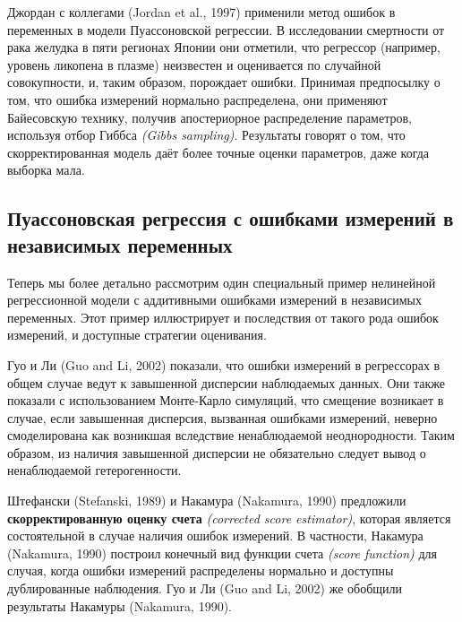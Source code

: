 Джордан с коллегами (Jordan et al., 1997) применили метод ошибок в переменных в модели Пуассоновской регрессии. В исследовании смертности от рака желудка в пяти регионах Японии они отметили, что регрессор (например, уровень ликопена в плазме) неизвестен и оценивается по случайной совокупности, и, таким образом, порождает ошибки. Принимая предпосылку о том, что ошибка измерений нормально распределена, они применяют Байесовскую технику, получив апостериорное распределение параметров, используя отбор Гиббса \emph{(Gibbs sampling)}. Результаты говорят о том, что скорректированная модель даёт более точные оценки параметров, даже когда выборка мала.

\subsection{Пуассоновская регрессия с ошибками измерений в независимых переменных} 
Теперь мы более детально рассмотрим один специальный пример нелинейной регрессионной модели с аддитивными ошибками измерений в независимых переменных. Этот пример иллюстрирует и последствия от такого рода ошибок измерений, и доступные стратегии оценивания.

Гуо и Ли (Guo and Li, 2002) показали, что ошибки измерений в регрессорах в общем случае ведут к завышенной дисперсии наблюдаемых данных. Они также показали с использованием Монте-Карло симуляций, что смещение возникает в случае, если завышенная дисперсия, вызванная ошибками измерений, неверно смоделирована как возникшая вследствие ненаблюдаемой неоднородности. Таким образом, из наличия завышенной дисперсии не обязательно следует вывод о ненаблюдаемой гетерогенности.

Штефански (Stefanski, 1989) и Накамура (Nakamura, 1990) предложили {\bf скорректированную оценку счета} \emph{(corrected score estimator)}, которая является состоятельной в случае наличия ошибок измерений. В частности, Накамура (Nakamura, 1990) построил конечный вид функции счета \emph{(score function)} для случая, когда ошибки измерений распределены нормально и доступны дублированные наблюдения. Гуо и Ли (Guo and Li, 2002) же обобщили результаты Накамуры (Nakamura, 1990).


